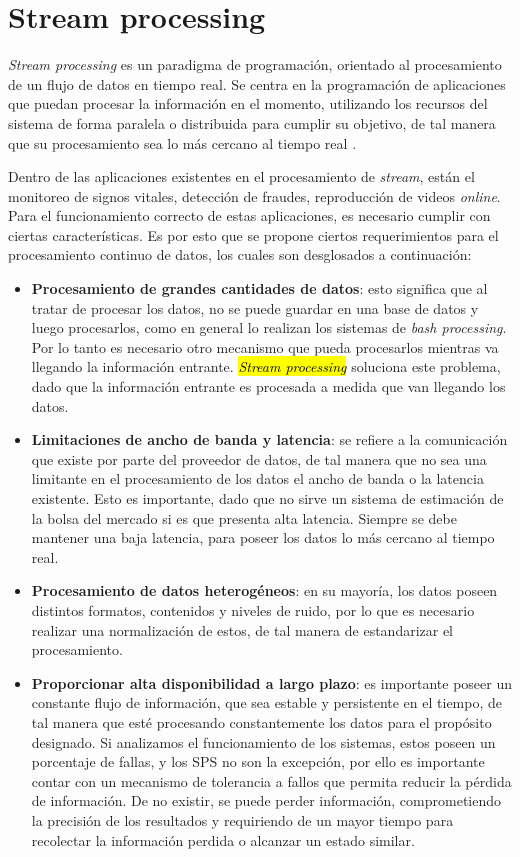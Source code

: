 \section{Stream processing}
\label{sec:streamProcessing}

\textit{Stream processing} es un paradigma de programación, orientado al procesamiento de un flujo de datos en tiempo real. Se centra en la programación de aplicaciones que puedan procesar la información en el momento, utilizando los recursos del sistema de forma paralela o distribuida para cumplir su objetivo, de tal manera que su procesamiento sea lo más cercano al tiempo real \citep{ChakravarthyJ09}.

Dentro de las aplicaciones existentes en el procesamiento de \textit{stream}, están el monitoreo de signos vitales, detección de fraudes, reproducción de videos \textit{online}. Para el funcionamiento correcto de estas aplicaciones, es necesario cumplir con ciertas características. Es por esto que se propone \citep{andrade2014fundamentals} ciertos requerimientos para el procesamiento continuo de datos, los cuales son desglosados a continuación:

\begin{itemize}
	\item \textbf{Procesamiento de grandes cantidades de datos}: esto significa que al tratar de procesar los datos, no se puede guardar en una base de datos y luego procesarlos, como en general lo realizan los sistemas de \textit{bash processing}. Por lo tanto es necesario otro mecanismo que pueda procesarlos mientras va llegando la información entrante. \hl{\textit{Stream processing}} soluciona este problema, dado que la información entrante es procesada a medida que van llegando los datos.
	\item \textbf{Limitaciones de ancho de banda y latencia}: se refiere a la comunicación que existe por parte del proveedor de datos, de tal manera que no sea una limitante en el procesamiento de los datos el ancho de banda o la latencia existente. Esto es importante, dado que no sirve un sistema de estimación de la bolsa del mercado si es que presenta alta latencia. Siempre se debe mantener una baja latencia, para poseer los datos lo más cercano al tiempo real.
	\item \textbf{Procesamiento de datos heterogéneos}: en su mayoría, los datos poseen distintos formatos, contenidos y niveles de ruido, por lo que es necesario realizar una normalización de estos, de tal manera de estandarizar el procesamiento.
	\item \textbf{Proporcionar alta disponibilidad a largo plazo}: es importante poseer un constante flujo de información, que sea estable y persistente en el tiempo, de tal manera que esté procesando constantemente los datos para el propósito designado. Si analizamos el funcionamiento de los sistemas, estos poseen un porcentaje de fallas, y los SPS no son la excepción, por ello es importante contar con un mecanismo de tolerancia a fallos que permita reducir la pérdida de información. De no existir, se puede perder información, comprometiendo la precisión de los resultados y requiriendo de un mayor tiempo para recolectar la información perdida o alcanzar un estado similar.
\end{itemize}

